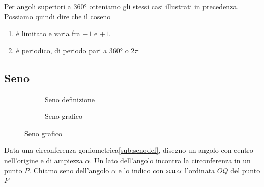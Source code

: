 Per angoli superiori a \ang{360} otteniamo gli stessi casi illustrati in precedenza. 
Possiamo quindi dire che il coseno
\begin{enumerate}
	\item è limitato e varia fra $-1$ e $+1$.
	\item è periodico, di periodo pari a \ang{360} o $2\pi$
	\end{enumerate} 
\begin{figure}
		\centering

		\label{fig:AndamentoCoseno1}
	\end{figure}%
	\begin{figure}
		\centering

		\label{fig:AndamentoCoseno2}
\end{figure}
\subsection{Seno}
\label{sec:senogonio}
\begin{figure}
	\begin{subfigure}[b]{.5\linewidth}
		\centering
			
		\caption{Seno definizione}\label{sub:senodef}
	\end{subfigure}%
	\begin{subfigure}[b]{.5\linewidth}
		\centering
		
		\caption{Seno grafico}\label{sub:senograf}
	\end{subfigure}
	\label{tab:funseno}
\end{figure}
\begin{definizione}[Seno]
	Data una circonferenza goniometrica\nobs\vref{sub:senodef}, disegno un angolo con centro nell'origine e di ampiezza $\alpha$. Un lato dell'angolo incontra la circonferenza in un punto $P$.  Chiamo seno dell'angolo $\alpha$ e lo indico con $\operatorname{sen}\alpha$ l'ordinata $OQ$  del punto $P$
\end{definizione}
